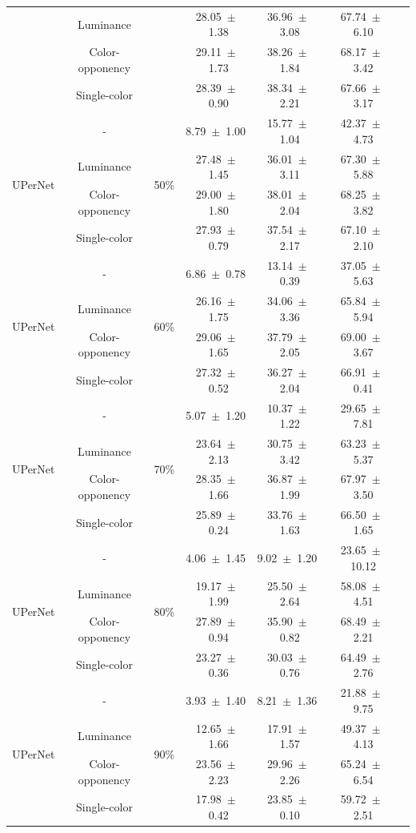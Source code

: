 \begin{table}[h]
\begin{tabular}{@{}lccc ccc@{}}
& Luminance & & 28.05~$\pm$~1.38 & 36.96~$\pm$~3.08 & 67.74~$\pm$~6.10 \\
& Color-opponency & & 29.11~$\pm$~1.73 & 38.26~$\pm$~1.84 & 68.17~$\pm$~3.42 \\
& Single-color & & 28.39~$\pm$~0.90 & 38.34~$\pm$~2.21 & 67.66~$\pm$~3.17 \\
\midrule
\multirow{4}{*}{UPerNet} & - & \multirow{4}{*}{50\%} & 8.79~$\pm$~1.00 & 15.77~$\pm$~1.04 & 42.37~$\pm$~4.73 \\
& Luminance & & 27.48~$\pm$~1.45 & 36.01~$\pm$~3.11 & 67.30~$\pm$~5.88 \\
& Color-opponency & & 29.00~$\pm$~1.80 & 38.01~$\pm$~2.04 & 68.25~$\pm$~3.82 \\
& Single-color & & 27.93~$\pm$~0.79 & 37.54~$\pm$~2.17 & 67.10~$\pm$~2.10 \\
\midrule
\multirow{4}{*}{UPerNet} & - & \multirow{4}{*}{60\%} & 6.86~$\pm$~0.78 & 13.14~$\pm$~0.39 & 37.05~$\pm$~5.63 \\
& Luminance & & 26.16~$\pm$~1.75 & 34.06~$\pm$~3.36 & 65.84~$\pm$~5.94 \\
& Color-opponency & & 29.06~$\pm$~1.65 & 37.79~$\pm$~2.05 & 69.00~$\pm$~3.67 \\
& Single-color & & 27.32~$\pm$~0.52 & 36.27~$\pm$~2.04 & 66.91~$\pm$~0.41 \\
\midrule
\multirow{4}{*}{UPerNet} & - & \multirow{4}{*}{70\%} & 5.07~$\pm$~1.20 & 10.37~$\pm$~1.22 & 29.65~$\pm$~7.81 \\
& Luminance & & 23.64~$\pm$~2.13 & 30.75~$\pm$~3.42 & 63.23~$\pm$~5.37 \\
& Color-opponency & & 28.35~$\pm$~1.66 & 36.87~$\pm$~1.99 & 67.97~$\pm$~3.50 \\
& Single-color & & 25.89~$\pm$~0.24 & 33.76~$\pm$~1.63 & 66.50~$\pm$~1.65 \\
\midrule
\multirow{4}{*}{UPerNet} & - & \multirow{4}{*}{80\%} & 4.06~$\pm$~1.45 & 9.02~$\pm$~1.20 & 23.65~$\pm$~10.12 \\
& Luminance & & 19.17~$\pm$~1.99 & 25.50~$\pm$~2.64 & 58.08~$\pm$~4.51 \\
& Color-opponency & & 27.89~$\pm$~0.94 & 35.90~$\pm$~0.82 & 68.49~$\pm$~2.21 \\
& Single-color & & 23.27~$\pm$~0.36 & 30.03~$\pm$~0.76 & 64.49~$\pm$~2.76 \\
\midrule
\multirow{4}{*}{UPerNet} & - & \multirow{4}{*}{90\%} & 3.93~$\pm$~1.40 & 8.21~$\pm$~1.36 & 21.88~$\pm$~9.75 \\
& Luminance & & 12.65~$\pm$~1.66 & 17.91~$\pm$~1.57 & 49.37~$\pm$~4.13 \\
& Color-opponency & & 23.56~$\pm$~2.23 & 29.96~$\pm$~2.26 & 65.24~$\pm$~6.54 \\
& Single-color & & 17.98~$\pm$~0.42 & 23.85~$\pm$~0.10 & 59.72~$\pm$~2.51 \\
\midrule
\bottomrule
\end{tabular}
\label{tab:sparse_results_upernet_acdc_full}
\end{table}
